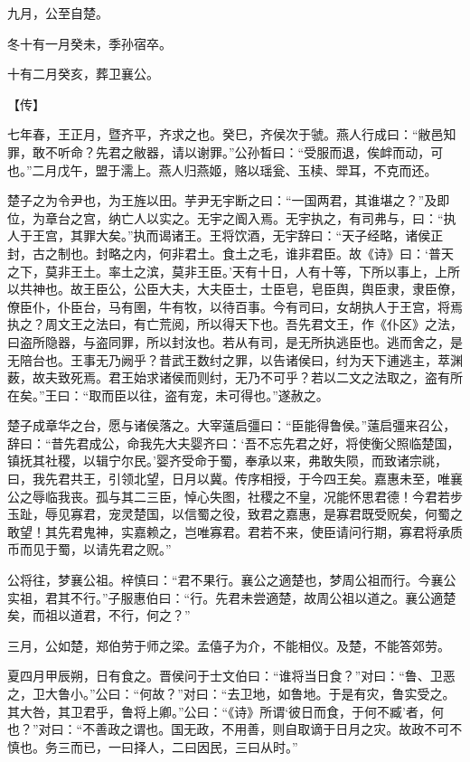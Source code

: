 \documentclass[a4paper,12pt,UTF8,twoside]{ctexbook}
\begin{document}
九月，公至自楚。

冬十有一月癸未，季孙宿卒。

十有二月癸亥，葬卫襄公。

【传】

七年春，王正月，暨齐平，齐求之也。癸巳，齐侯次于虢。燕人行成曰：“敝邑知罪，敢不听命？先君之敝器，请以谢罪。”公孙晳曰：“受服而退，俟衅而动，可也。”二月戊午，盟于濡上。燕人归燕姬，赂以瑶瓮、玉椟、斝耳，不克而还。

楚子之为令尹也，为王旌以田。芋尹无宇断之曰：“一国两君，其谁堪之？”及即位，为章台之宫，纳亡人以实之。无宇之阍入焉。无宇执之，有司弗与，曰：“执人于王宫，其罪大矣。”执而谒诸王。王将饮酒，无宇辞曰：“天子经略，诸侯正封，古之制也。封略之内，何非君土。食土之毛，谁非君臣。故《诗》曰：‘普天之下，莫非王土。率土之滨，莫非王臣。’天有十日，人有十等，下所以事上，上所以共神也。故王臣公，公臣大夫，大夫臣士，士臣皂，皂臣舆，舆臣隶，隶臣僚，僚臣仆，仆臣台，马有圉，牛有牧，以待百事。今有司曰，女胡执人于王宫，将焉执之？周文王之法曰，有亡荒阅，所以得天下也。吾先君文王，作《仆区》之法，曰盗所隐器，与盗同罪，所以封汝也。若从有司，是无所执逃臣也。逃而舍之，是无陪台也。王事无乃阙乎？昔武王数纣之罪，以告诸侯曰，纣为天下逋逃主，萃渊薮，故夫致死焉。君王始求诸侯而则纣，无乃不可乎？若以二文之法取之，盗有所在矣。”王曰：“取而臣以往，盗有宠，未可得也。”遂赦之。

楚子成章华之台，愿与诸侯落之。大宰薳启彊曰：“臣能得鲁侯。”薳启彊来召公，辞曰：“昔先君成公，命我先大夫婴齐曰：‘吾不忘先君之好，将使衡父照临楚国，镇抚其社稷，以辑宁尔民。’婴齐受命于蜀，奉承以来，弗敢失陨，而致诸宗祧，曰，我先君共王，引领北望，日月以冀。传序相授，于今四王矣。嘉惠未至，唯襄公之辱临我丧。孤与其二三臣，悼心失图，社稷之不皇，况能怀思君德！今君若步玉趾，辱见寡君，宠灵楚国，以信蜀之役，致君之嘉惠，是寡君既受贶矣，何蜀之敢望！其先君鬼神，实嘉赖之，岂唯寡君。君若不来，使臣请问行期，寡君将承质币而见于蜀，以请先君之贶。”

公将往，梦襄公祖。梓慎曰：“君不果行。襄公之適楚也，梦周公祖而行。今襄公实祖，君其不行。”子服惠伯曰：“行。先君未尝適楚，故周公祖以道之。襄公適楚矣，而祖以道君，不行，何之？”

三月，公如楚，郑伯劳于师之梁。孟僖子为介，不能相仪。及楚，不能答郊劳。

夏四月甲辰朔，日有食之。晋侯问于士文伯曰：“谁将当日食？”对曰：“鲁、卫恶之，卫大鲁小。”公曰：“何故？”对曰：“去卫地，如鲁地。于是有灾，鲁实受之。其大咎，其卫君乎，鲁将上卿。”公曰：“《诗》所谓‘彼日而食，于何不臧’者，何也？”对曰：“不善政之谓也。国无政，不用善，则自取谪于日月之灾。故政不可不慎也。务三而已，一曰择人，二曰因民，三曰从时。”
\end{document}
